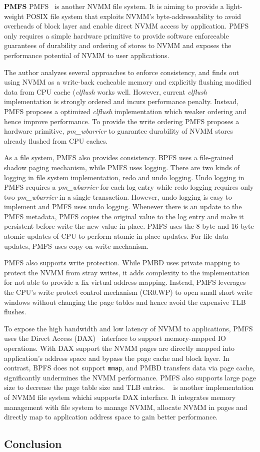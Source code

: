 \textbf{PMFS} PMFS~\cite{PMFS} is another NVMM file system. It is aiming to
provide a
light-weight POSIX file system that exploits NVMM's byte-addressability to
avoid overheads of block layer and enable direct NVMM access by application.
PMFS only requires a simple hardware primitive to provide software enforceable
guarantees of durability and ordering of stores to NVMM and exposes the 
performance potential of NVMM to user applications.

The author analyzes several approaches to enforce consistency, and finds out
using NVMM as a write-back cacheable memory and explicitly flushing modified
data from CPU cache (\emph{clflush} works well. However, current \emph{clflush}
implementation is strongly ordered and incurs performance penalty. Instead,
PMFS proposes a optimized \emph{clflush} implementation which weaker ordering
and hence improve performance. To provide the write ordering PMFS proposes
a hardware primitive, \emph{pm\_wbarrier} to guarantee durability of NVMM stores
already flushed from CPU caches.

As a file system, PMFS also provides consistency. BPFS uses a file-grained
shadow paging mechanism, while PMFS uses logging. There are two kinds of logging
in file system implementation, redo and undo logging. Undo logging in PMFS
requires a \emph{pm\_wbarrier} for each log entry while redo logging requires
only two \emph{pm\_wbarrier} in a single transaction. However, undo logging
is easy to implement and PMFS uses undo logging. Whenever there is an update
to the PMFS metadata, PMFS copies the original value to the log entry and
make it persistent before write the new value in-place. PMFS uses the
8-byte and 16-byte atomic updates of CPU to perform atomic in-place updates.
For file data updates, PMFS uses copy-on-write mechanism.

PMFS also supports write protection. While PMBD uses private mapping to
protect the NVMM from stray writes, it adds complexity to the implementation
for not able to provide a fix virtual address mapping. Instead, PMFS leverages
the CPU's write protect control mechanism (CR0.WP) to open small short write
windows without changing the page tables and hence avoid the expensive
TLB flushes.

To expose the high bandwidth and low latency of NVMM to applications,
PMFS uses the Direct Access (DAX)~\cite{ext4dax} interface to support
memory-mapped
IO operations. With DAX support the NVMM pages are directly mapped into
application's address space and bypass the page cache and block layer.
In contrast, BPFS does not support \texttt{mmap}, and PMBD transfers
data via page cache, significantly undermines the NVMM performance.
PMFS also supports large page size to decrease the page table size and
TLB entries. ~\cite{mmfs} is another implementation of NVMM file system
whichi supports DAX interface. It integrates memory management with file system
to manage NVMM, allocate NVMM in pages and directly map to application
address space to gain better performance.


\subsection{Conclusion} 
\label{sec:fs-conclude}
